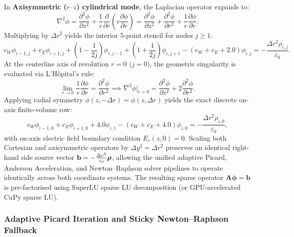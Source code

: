 \documentclass[11pt,a4paper]{article}
\begin{document}
In \textbf{Axisymmetric ($r\text{--}z$) cylindrical mode}, the Laplacian operator expands to:
\begin{equation}
    \nabla^2 \phi = \frac{\partial^2 \phi}{\partial z^2} + \frac{1}{r}\frac{\partial}{\partial r}\left(r \frac{\partial \phi}{\partial r}\right) = \frac{\partial^2 \phi}{\partial z^2} + \frac{\partial^2 \phi}{\partial r^2} + \frac{1}{r}\frac{\partial \phi}{\partial r}.
\end{equation}
Multiplying by $\Delta r^2$ yields the interior 5-point stencil for nodes $j \ge 1$:
\begin{equation}
    c_W \phi_{i-1,j} + c_E \phi_{i+1,j} + \left(1 - \frac{1}{2j}\right)\phi_{i,j-1} + \left(1 + \frac{1}{2j}\right)\phi_{i,j+1} - (c_W + c_E + 2.0)\phi_{i,j}
    = -\frac{\Delta r^2 \rho_{i,j}}{\varepsilon_{0}}.
\end{equation}
At the centerline axis of revolution $r = 0$ ($j = 0$), the geometric singularity is evaluated via L'H\^opital's rule:
\begin{equation}
    \lim_{r \to 0} \frac{1}{r}\frac{\partial \phi}{\partial r} = \frac{\partial^2 \phi}{\partial r^2} \implies \nabla^2 \phi\Big|_{r=0} = \frac{\partial^2 \phi}{\partial z^2} + 2\frac{\partial^2 \phi}{\partial r^2}.
\end{equation}
Applying radial symmetry $\phi(z, -\Delta r) = \phi(z, \Delta r)$ yields the exact discrete on-axis finite-volume row:
\begin{equation}
    c_W \phi_{i-1,0} + c_E \phi_{i+1,0} + 4.0 \phi_{i,1} - (c_W + c_E + 4.0)\phi_{i,0} = -\frac{\Delta r^2 \rho_{i,0}}{\varepsilon_0},
\end{equation}
with on-axis electric field boundary condition $E_r(z, 0) = 0$. Scaling both Cartesian and axisymmetric operators by $\Delta y^2 = \Delta r^2$ preserves an identical right-hand side source vector $\vb{b} = -\frac{\Delta r^2}{\varepsilon_0}\boldsymbol{\rho}$, allowing the unified adaptive Picard, Anderson Acceleration, and Newton--Raphson solver pipelines to operate identically across both coordinate systems. The resulting sparse operator $\mathbf{A} \boldsymbol{\phi} = \mathbf{b}$ is pre-factorised using SuperLU sparse LU decomposition (or GPU-accelerated CuPy sparse LU).

\subsubsection{Adaptive Picard Iteration and Sticky Newton--Raphson Fallback}
\end{document}
